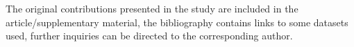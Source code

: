 \documentclass[utf8]{test_class}
\begin{document}
The original contributions presented in the study are included in the article/supplementary
material, the bibliography contains links to some datasets used, further inquiries can be directed
to the corresponding author.


%  


 


\nocite{*} %


\end{document}
